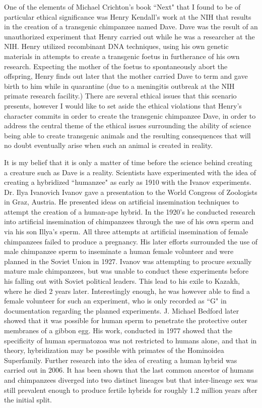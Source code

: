 \documentclass[letterpaper,10pt,twoside]{article}
\begin{document}
One of the elements of Michael Crichton's book ``Next" that I found to be of particular ethical significance was Henry Kendall's work at the NIH that results in the creation of a transgenic chimpanzee named Dave.  Dave was the result of an unauthorized experiment that Henry carried out while he was a researcher at the NIH.  Henry utilized recombinant DNA techniques, using his own genetic materials in attempts to create a transgenic foetus in furtherance of his own research.  Expecting the mother of the foetus to spontaneously abort the offspring, Henry finds out later that the mother carried Dave to term and gave birth to him while in quarantine (due to a meningitis outbreak at the NIH primate research facility.)  There are several ethical issues that this scenario presents, however I would like to set aside the ethical violations that Henry's character commits in order to create the transgenic chimpanzee Dave, in order to address the central theme of the ethical issues surrounding the ability of science being able to create transgenic animals and the resulting consequences that will no doubt eventually arise when such an animal is created in reality.

It is my belief that it is only a matter of time before the science behind creating a creature such as Dave is a reality.  Scientists have experimented with the idea of creating a hybridized ``humanzee" as early as 1910 with the Ivanov experiments.  Dr. Ilya Ivanovich Ivanov gave a presentation to the World Congress of Zoologists in Graz, Austria.  He presented ideas on artificial insemination techniques to attempt the creation of a human-ape hybrid.  In the 1920's he conducted research into artificial insemination of chimpanzees through the use of his own sperm and via his son Illya's sperm.  All three attempts at artificial insemination of female chimpanzees failed to produce a pregnancy.  His later efforts surrounded the use of male chimpanzee sperm to inseminate a human female volunteer and were planned in the Soviet Union in 1927.  Ivanov was attempting to procure sexually mature male chimpanzees, but was unable to conduct these experiments before his falling out with Soviet political leaders. This lead to his exile to Kazakh, where he died 2 years later.  Interestingly enough, he was however able to find a female volunteer for such an experiment, who is only recorded as ``G" in documentation regarding the planned experiments.  J. Michael Bedford later showed that it was possible for human sperm to penetrate the protective outer membranes of a gibbon egg.  His work, conducted in 1977 showed that the specificity of human spermatozoa was not restricted to humans alone, and that in theory, hybridization may be possible with primates of the Hominoidea Superfamily.    Further research into the idea of creating a human hybrid was carried out in 2006.  It has been shown that the last common ancestor of humans and chimpanzees diverged  into two distinct lineages but that inter-lineage sex was still prevalent enough to produce fertile hybrids for roughly 1.2 million years after the initial split.
\end{document}
